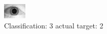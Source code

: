 \begin{figure}[h!]
\begin{center}
\includegraphics[width=0.60\columnwidth]{figures/ID1607_class_3_target_2.png}
\end{center}
\caption{ Classification: 3 actual target: 2}
\label{fig:ID1607_class_3_target_2}
\end{figure}
